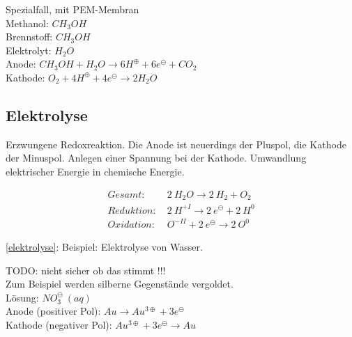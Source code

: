 Spezialfall, mit PEM-Membran\\

Methanol: $CH_3OH$\\

Brennstoff: $CH_3OH$\\

Elektrolyt: $H_2O$\\

Anode: $CH_3OH + H_2O \rightarrow 6 H^\oplus + 6 e^\ominus + CO_2$\\

Kathode: $O_2 + 4 H^\oplus + 4e^\ominus \rightarrow 2 H_2O$


\subsection{Elektrolyse}

Erzwungene Redoxreaktion. Die Anode ist neuerdings der Pluspol, die Kathode der Minuspol. Anlegen einer Spannung bei der Kathode. Umwandlung elektrischer Energie in chemische Energie.

{\large
	\begin{equation}
		\label{elektrolyse}
		\begin{split}
			Gesamt:\ &2\ H_2O \rightarrow 2\ H_2 + O_2 \\
			Reduktion:\ &2\ H^{+I} \rightarrow 2\ e^\ominus + 2\ H^0 \\
			Oxidation:\ &O^{-II} + 2\ e^\ominus \rightarrow 2\ O^0
		\end{split}
	\end{equation}
}

\ref{elektrolyse}: Beispiel: Elektrolyse von Wasser. \\

\begin{definition}[Galvanisieren]
	TODO: nicht sicher ob das stimmt !!!\\
	
	Zum Beispiel werden silberne Gegenstände vergoldet.\\
	
	Lösung: $NO_3^\ominus\ (aq)$\\
	
	Anode (positiver Pol): $Au \rightarrow Au^{3\oplus} + 3e^{\ominus}$\\
	
	Kathode (negativer Pol): $Au^{3\oplus} + 3e^{\ominus} \rightarrow Au$
\end{definition}
